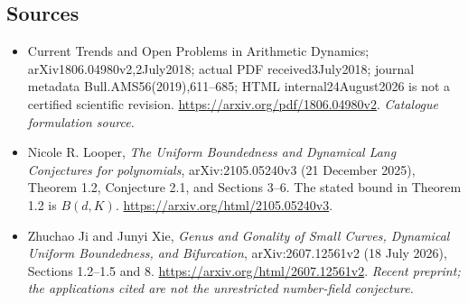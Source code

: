 \documentclass[11pt,a4paper]{article}
\begin{document}
\subsection{Sources}
\begin{itemize}\raggedright
\item[\textnormal{[S1]}]\hypertarget{source:statement:1}{} Current Trends and Open Problems in Arithmetic Dynamics; arXiv1806.04980v2,2July2018; actual PDF received3July2018; journal metadata Bull.AMS56(2019),611–685; HTML internal24August2026 is not a certified scientific revision.
\url{https://arxiv.org/pdf/1806.04980v2}.
{\small\textit{Catalogue formulation source.}}
\item[\textnormal{[E1]}]\hypertarget{extra:statement:1}{} Nicole R. Looper,
\emph{The Uniform Boundedness and Dynamical Lang Conjectures for polynomials},
arXiv:2105.05240v3 (21 December 2025), Theorem 1.2, Conjecture 2.1, and
Sections 3--6. The stated bound in Theorem 1.2 is $B(d,K)$.
\url{https://arxiv.org/html/2105.05240v3}.
\item[\textnormal{[E2]}]\hypertarget{extra:statement:2}{} Zhuchao Ji and Junyi Xie,
\emph{Genus and Gonality of Small Curves, Dynamical Uniform Boundedness, and Bifurcation},
arXiv:2607.12561v2 (18 July 2026), Sections 1.2--1.5 and 8.
\url{https://arxiv.org/html/2607.12561v2}.
{\small\textit{Recent preprint; the applications cited are not the unrestricted number-field conjecture.}}
\end{itemize}
\end{document}
